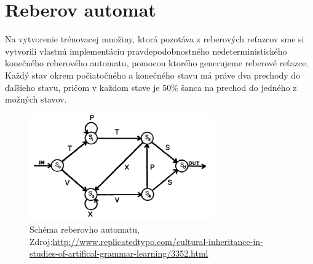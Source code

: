 \section{Reberov automat}
Na vytvorenie trénovacej množiny, ktorá pozotáva z reberových reťazcov sme si vytvorili vlastnú implementáciu pravdepodobnostného nedeterministického
konečného reberového automatu, pomocou ktorého generujeme reberové reťazce.
Každý stav okrem počiatočného a konečného stavu má práve dva prechody do ďaľšieho stavu, 
pričom v každom stave je 50\% šanca na prechod do jedného z možných stavov.
\begin{figure}[H]
    \centering
    \includegraphics[width=8cm]{assets/reber}
    \caption{Schéma reberovho automatu, Zdroj:\url{http://www.replicatedtypo.com/cultural-inheritance-in-studies-of-artifical-grammar-learning/3352.html}}
\end{figure}
